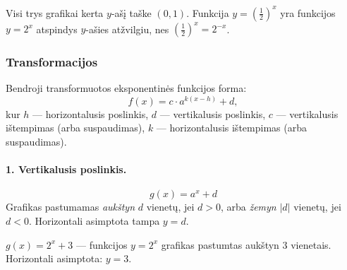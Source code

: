 \begin{center}
\end{center}

\begin{remark}
Visi trys grafikai kerta $y$\nobreakdash-ašį taške $(0, 1)$. Funkcija
$y = \left(\tfrac{1}{2}\right)^x$ yra funkcijos $y = 2^x$ atspindys $y$\nobreakdash-ašies
atžvilgiu, nes $\left(\tfrac{1}{2}\right)^x = 2^{-x}$.
\end{remark}

\subsubsection*{Transformacijos}

Bendroji transformuotos eksponentinės funkcijos forma:
\[
    f(x) = c \cdot a^{k(x - h)} + d,
\]
kur $h$ --- horizontalusis poslinkis, $d$ --- vertikalusis poslinkis,
$c$ --- vertikalusis ištempimas (arba suspaudimas), $k$ --- horizontalusis
ištempimas (arba suspaudimas).

\paragraph{1. Vertikalusis poslinkis.}
\[
    g(x) = a^x + d
\]
Grafikas pastumamas \textit{aukštyn} $d$ vienetų, jei $d > 0$, arba
\textit{žemyn} $|d|$ vienetų, jei $d < 0$.
Horizontali asimptota tampa $y = d$.

\begin{example}
$g(x) = 2^x + 3$ --- funkcijos $y = 2^x$ grafikas pastumtas aukštyn 3 vienetais.
Horizontali asimptota: $y = 3$.
\end{example}


